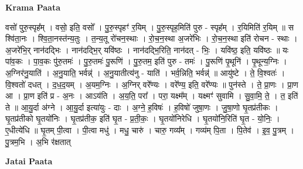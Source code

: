 \documentclass[17pt]{extarticle}
\begin{document}
\textbf{Krama Paata} \newline

वसो॑ पुरु॒स्पृह᳚म् । वसो॒ इति॒ वसो᳚ । पु॒रु॒स्पृहꣳ॑ र॒यिम् । पु॒रु॒स्पृह॒मिति॑ पुरु - स्पृह᳚म् । र॒यिमिति॑ र॒यिम् ॥ स श्वि॑ता॒नः । श्वि॒ता॒नस्त॑न्य॒तुः । त॒न्य॒तू रो॑चन॒स्थाः । रो॒च॒न॒स्था अ॒जरे॑भिः । रो॒च॒न॒स्था इति॑ रोचन - स्थाः । अ॒जरे॑भि॒र् नान॑दद्भिः । नान॑दद्भि॒र् यवि॑ष्ठः । नान॑दद्भि॒रिति॒ नान॑दत् - भिः॒ । यवि॑ष्ठ॒ इति॒ यवि॑ष्ठः ॥ यः पा॑व॒कः । पा॒व॒कः पु॑रु॒तमः॑ । पु॒रु॒तमः॑ पु॒रूणि॑ । पु॒रु॒तम॒ इति॑ पुरु - तमः॑ । पु॒रूणि॑ पृ॒थूनि॑ । पृ॒थून्य॒ग्निः । अ॒ग्निर॑नु॒याति॑ । अ॒नु॒याति॒ भर्वन्न्॑ । अ॒नु॒यातीत्य॑नु - याति॑ । भर्व॒न्निति॒ भर्वन्न्॑ ॥ आयु॑ष्टे । ते॒ वि॒श्वतः॑ । वि॒श्वतो॑ दधत् । द॒ध॒द॒यम् । अ॒यम॒ग्निः । अ॒ग्निर् वरे᳚ण्यः । वरे᳚ण्य॒ इति॒ वरे᳚ण्यः ॥ पुन॑स्ते । ते॒ प्रा॒णः । प्रा॒ण आ । प्रा॒ण इति॑ प्र - अ॒नः । आऽय॑ति । अ॒य॒ति॒ परा᳚ । परा॒ यक्ष्म᳚म् । यक्ष्मꣳ॑ सुवामि । सु॒वा॒मि॒ ते॒ । त॒ इति॑ ते ॥ आ॒यु॒र्दा अ॑ग्ने । आ॒यु॒र्दा इत्या॑युः - दाः । अ॒ग्ने॒ ह॒विषः॑ । ह॒विषो॑ जुषा॒णः । जु॒षा॒णो घृ॒तप्र॑तीकः । घृ॒तप्र॑तीको घृ॒तयो॑निः । घृ॒तप्र॑तीक॒ इति॑ घृ॒त - प्र॒ती॒कः॒ । घृ॒तयो॑निरेधि । घृ॒तयो॑नि॒रिति॑ घृ॒त - यो॒निः॒ । ए॒धीत्ये॑धि ॥ घृ॒तम् पी॒त्वा । पी॒त्वा मधु॑ । मधु॒ चारु॑ । चारु॒ गव्य᳚म् । गव्य॑म् पि॒ता । पि॒तेव॑ । इ॒व॒ पु॒त्रम् । पु॒त्रम॒भि । अ॒भि र॑क्षतात् \newline

\textbf{Jatai Paata} \newline
\end{document}
